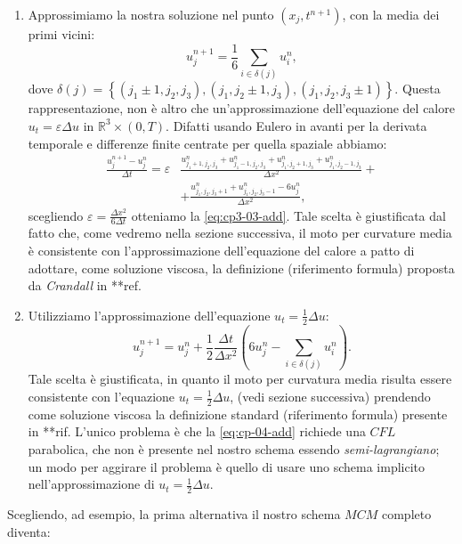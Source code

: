 \begin{enumerate}
  \item Approssimiamo la nostra soluzione nel punto $(x_j,t^{n+1})$, con la media dei primi vicini:
    \begin{equation}
      \label{eq:cp3-03-add}
      u_j^{n+1}=\frac{1}{6}\sum_{i\in\delta(j)}u_i^n,
    \end{equation}
dove $\delta(j)=\left\{(j_1\pm 1,j_2,j_3),(j_1,j_2\pm 1,j_3),(j_1,j_2,j_3\pm 1)\right\}$. Questa rappresentazione, non è altro che un'approssimazione dell'equazione del calore $u_t=\varepsilon\Delta u$ in $\mathbb{R}^3\times(0,T)$. Difatti usando Eulero in avanti per la derivata temporale e differenze finite centrate per quella spaziale abbiamo:
\[
\begin{aligned}
  \frac{u_j^{n+1}-u_j^n}{\Delta t}=\varepsilon&\frac{u_{j_1 + 1,j_2,j_3}^n +
    u_{j_1 - 1,j_2,j_3}^n + u_{j_1,j_2 + 1,j_3}^n + u_{j_1,j_2 - 1,j_3}^n}{\Delta x^2} + \\
    &+ \frac{u_{j_1,j_2,j_3 + 1}^n + u_{j_1,j_2,j_3 - 1}^n - 6u_j^n}{\Delta x^2},
\end{aligned}
\]
scegliendo $\varepsilon=\frac{\Delta x^2}{6\Delta t}$ otteniamo la \eqref{eq:cp3-03-add}.
Tale scelta è giustificata dal fatto che, come vedremo nella sezione successiva, il moto per curvature media è consistente con l'approssimazione dell'equazione del calore a patto di adottare, come soluzione viscosa, la definizione (riferimento formula) proposta da \emph{Crandall} in **ref.

  \item Utilizziamo l'approssimazione dell'equazione $u_t=\frac{1}{2}\Delta u$:
    \begin{equation}
      \label{eq:cp-04-add}
      u_j^{n+1}=u_j^n +\frac{1}{2}\frac{\Delta t}{\Delta x^2}\left(6u_j^n - \sum_{i\in\delta(j)}u_i^n\right).
    \end{equation}
Tale scelta è giustificata, in quanto il moto per curvatura media risulta essere consistente con l'equazione $u_t=\frac{1}{2}\Delta u$, (vedi sezione successiva) prendendo come soluzione viscosa la definizione standard (riferimento formula) presente in **rif. L'unico problema è che la \eqref{eq:cp-04-add}
richiede una $\mathit{CFL}$ parabolica, che non è presente nel nostro schema essendo \emph{semi-lagrangiano}; un modo per aggirare il problema è quello di usare uno schema implicito nell'approssimazione di  $u_t=\frac{1}{2}\Delta u$.
\end{enumerate}
Scegliendo, ad esempio, la prima alternativa il nostro schema $\mathit{MCM}$ completo diventa:

